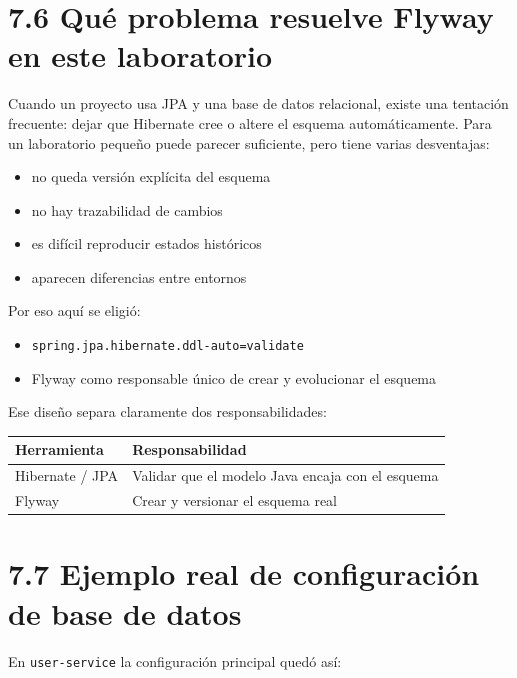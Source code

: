 \documentclass[
a4paper,
12pt]{report}
\providecommand{\tightlist}{%
  \setlength{\itemsep}{0pt}\setlength{\parskip}{0pt}}
\begin{document}
\section{7.6 Qué problema resuelve Flyway en este
laboratorio}\label{quuxe9-problema-resuelve-flyway-en-este-laboratorio}

Cuando un proyecto usa JPA y una base de datos relacional, existe una
tentación frecuente: dejar que Hibernate cree o altere el esquema
automáticamente. Para un laboratorio pequeño puede parecer suficiente,
pero tiene varias desventajas:

\begin{itemize}
\tightlist
\item
  no queda versión explícita del esquema
\item
  no hay trazabilidad de cambios
\item
  es difícil reproducir estados históricos
\item
  aparecen diferencias entre entornos
\end{itemize}

Por eso aquí se eligió:

\begin{itemize}
\tightlist
\item
  \texttt{spring.jpa.hibernate.ddl-auto=validate}
\item
  Flyway como responsable único de crear y evolucionar el esquema
\end{itemize}

Ese diseño separa claramente dos responsabilidades:

{\def\LTcaptype{table} %
\begin{longtable}[]{@{}ll@{}}
\toprule\noalign{}
Herramienta & Responsabilidad \\
\midrule\noalign{}
\endhead
\bottomrule\noalign{}
\endlastfoot
Hibernate / JPA & Validar que el modelo Java encaja con el esquema \\
Flyway & Crear y versionar el esquema real \\
\end{longtable}
}

\section{7.7 Ejemplo real de configuración de base de
datos}\label{ejemplo-real-de-configuraciuxf3n-de-base-de-datos}

En \texttt{user-service} la configuración principal quedó así:
\end{document}
